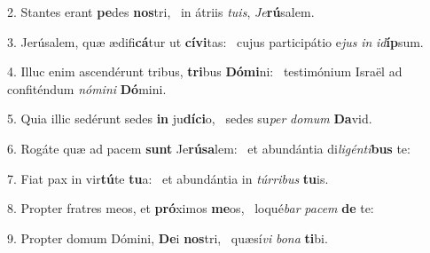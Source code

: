 2. Stantes erant \textbf{pe}des \textbf{nos}tri, \ast\  in átriis \textit{tu}\textit{is}, \textit{Je}\textbf{rú}salem.\

3. Jerúsalem, quæ ædifi\textbf{cá}tur ut \textbf{cí}\textbf{vi}tas: \ast\  cujus participátio e\textit{jus} \textit{in} \textit{id}\textbf{íp}sum.\

4. Illuc enim ascendérunt tribus, \textbf{tri}bus \textbf{Dó}\textbf{mi}ni: \ast\  testimónium Israël ad confiténdum \textit{nó}\textit{mi}\textit{ni} \textbf{Dó}mini.\

5. Quia illic sedérunt sedes \textbf{in} ju\textbf{dí}\textbf{ci}o, \ast\  sedes su\textit{per} \textit{do}\textit{mum} \textbf{Da}vid.\

6. Rogáte quæ ad pacem \textbf{sunt} Je\textbf{rú}\textbf{sa}lem: \ast\  et abundántia di\textit{li}\textit{gén}\textit{ti}\textbf{bus} te:\

7. Fiat pax in vir\textbf{tú}te \textbf{tu}a: \ast\  et abundántia in \textit{túr}\textit{ri}\textit{bus} \textbf{tu}is.\

8. Propter fratres meos, et \textbf{pró}ximos \textbf{me}os, \ast\  loqué\textit{bar} \textit{pa}\textit{cem} \textbf{de} te:\

9. Propter domum Dómini, \textbf{De}i \textbf{nos}tri, \ast\  quæsí\textit{vi} \textit{bo}\textit{na} \textbf{ti}bi.\

